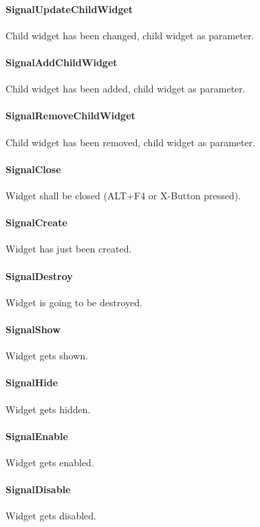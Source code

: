 \paragraph{SignalUpdateChildWidget}
Child widget has been changed, child widget as parameter.

\paragraph{SignalAddChildWidget}
Child widget has been added, child widget as parameter.

\paragraph{SignalRemoveChildWidget}
Child widget has been removed, child widget as parameter.

\paragraph{SignalClose}
Widget shall be closed (ALT+F4 or X-Button pressed).

\paragraph{SignalCreate}
Widget has just been created.

\paragraph{SignalDestroy}
Widget is going to be destroyed.

\paragraph{SignalShow}
Widget gets shown.

\paragraph{SignalHide}
Widget gets hidden.

\paragraph{SignalEnable}
Widget gets enabled.

\paragraph{SignalDisable}
Widget gets disabled.

